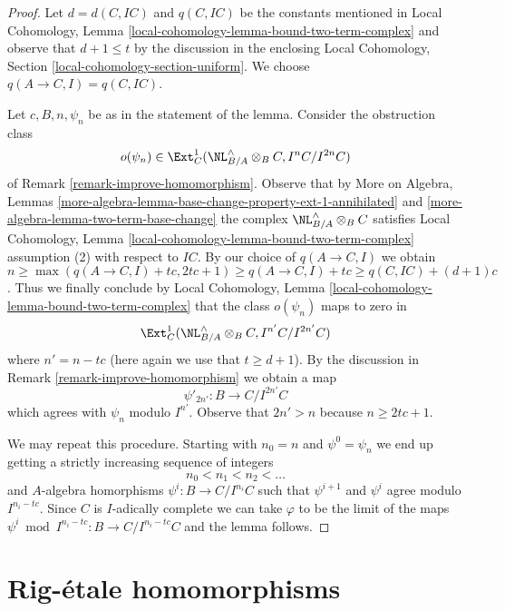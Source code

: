 \begin{proof}
Let $d = d(C, IC)$ and $q(C, IC)$ be the constants mentioned in
Local Cohomology, Lemma \ref{local-cohomology-lemma-bound-two-term-complex}
and observe that $d + 1 \leq t$ by the discussion in the enclosing
Local Cohomology, Section \ref{local-cohomology-section-uniform}.
We choose $q(A \to C, I) = q(C, IC)$.

\medskip\noindent
Let $c, B, n, \psi_n$ be as in the statement of the lemma.
Consider the obstruction class
$$
o(\psi_n) \in \Ext^1_C(\NL_{B/A}^\wedge \otimes_B C, I^nC/I^{2n}C)
$$
of Remark \ref{remark-improve-homomorphism}. Observe that by
More on Algebra, Lemmas
\ref{more-algebra-lemma-base-change-property-ext-1-annihilated} and
\ref{more-algebra-lemma-two-term-base-change}
the complex $\NL_{B/A}^\wedge \otimes_B C$ satisfies
Local Cohomology, Lemma \ref{local-cohomology-lemma-bound-two-term-complex}
assumption (2) with respect to $IC$.
By our choice of $q(A \to C, I)$ we obtain
$n \geq  \max(q(A \to C, I) + tc, 2tc + 1) \geq q(A \to C, I) + tc
\geq q(C, IC) + (d + 1)c$. Thus we finally conclude by
Local Cohomology, Lemma \ref{local-cohomology-lemma-bound-two-term-complex}
that the class $o(\psi_n)$ maps to zero in
$$
\Ext^1_C(\NL_{B/A}^\wedge \otimes_B C, I^{n'}C/I^{2n'}C)
$$
where $n' = n - tc$ (here again we use that $t \geq d + 1$).
By the discussion in Remark \ref{remark-improve-homomorphism} we obtain a map
$$
\psi'_{2n'} : B \to C/I^{2n'}C
$$
which agrees with $\psi_n$ modulo $I^{n'}$.
Observe that $2n' > n$ because $n \geq 2tc + 1$.

\medskip\noindent
We may repeat this procedure. Starting with $n_0 = n$ and
$\psi^0 = \psi_n$ we end up getting a strictly increasing
sequence of integers
$$
n_0 < n_1 < n_2 < \ldots
$$
and $A$-algebra homorphisms $\psi^i : B \to C/I^{n_i}C$
such that $\psi^{i + 1}$ and $\psi^i$ agree modulo $I^{n_i - tc}$.
Since $C$ is $I$-adically complete we can take $\varphi$
to be the limit of the maps
$\psi^i \bmod I^{n_i - tc} : B \to C/I^{n_i - tc}C$
and the lemma follows.
\end{proof}












\section{Rig-\'etale homomorphisms}
\label{section-rig-etale}

